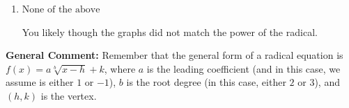 \documentclass{extbook}[14pt]
\begin{document}
\begin{enumerate}
{\begin{enumerate}[label=\Alph*.]
This corresponds to switching the coefficient AND switching the $x$-value of the vertex with the root degree as $2$.
\item \( \text{None of the above} \)

You likely though the graphs did not match the power of the radical.
\end{enumerate}

\textbf{General Comment:} Remember that the general form of a radical equation is $ f(x) = a \sqrt[b]{x - h} + k$, where $a$ is the leading coefficient (and in this case, we assume is either $1$ or $-1$), $b$ is the root degree (in this case, either $2$ or $3$), and $(h, k)$ is the vertex.
}
\end{enumerate}
\end{document}

